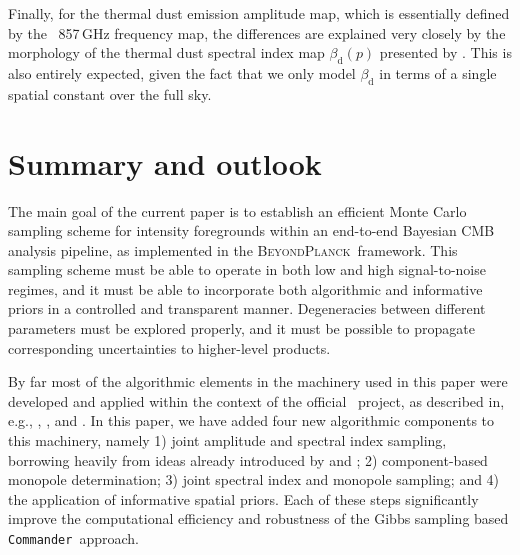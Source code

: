 \documentclass[twocolumn]{aa}
\def\commander{\texttt{Commander}}
\newcommand{\BP}{\textsc{BeyondPlanck}}
\begin{document}
Finally, for the thermal dust emission amplitude map, which is
essentially defined by the \Planck\ 857\,GHz frequency map, the
differences are explained very closely by the morphology of the
thermal dust spectral index map $\beta_{\mathrm{d}}(p)$ presented by
\citet{planck2014-a12}. This is also entirely expected, given the fact
that we only model $\beta_{\mathrm{d}}$ in terms of a single spatial
constant over the full sky.



\section{Summary and outlook}
\label{sec:conclusions}

The main goal of the current paper is to establish an efficient Monte
Carlo sampling scheme for intensity foregrounds within an end-to-end
Bayesian CMB analysis pipeline, as implemented in the
\BP\ framework. This sampling scheme must be able to operate in both
low and high signal-to-noise regimes, and it must be able to
incorporate both algorithmic and informative priors in a controlled
and transparent manner. Degeneracies between different parameters must
be explored properly, and it must be possible to propagate
corresponding uncertainties to higher-level products.

By far most of the algorithmic elements in the machinery used in this
paper were developed and applied within the context of the official
\Planck\ project, as described in, e.g.,
\citet{planck2014-a12}, \citet{planck2016-l04}, and \citet{npipe}. In this paper, we have
added four new algorithmic components to this machinery, namely 1) joint amplitude
and spectral index sampling, borrowing heavily from ideas already
introduced by \citet{2009MNRAS.392..216S} and \citet{stivoli:2010}; 2)
component-based monopole determination; 3) joint spectral index and
monopole sampling; and 4) the application of informative spatial
priors. Each of these steps significantly improve the computational
efficiency and robustness of the Gibbs sampling based
\commander\ approach.
\end{document}
